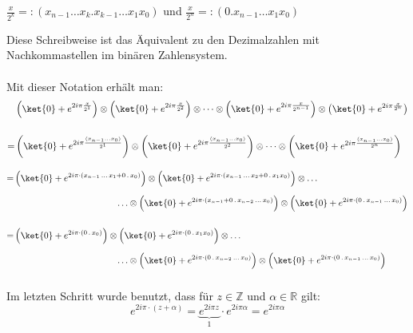 $\frac{x}{2^k} =: (x_{n - 1}\dots x_k.x_{k - 1}\dots x_1x_0)$ \quad und \quad $\frac{x}{2^n} =: (0.x_{n - 1}\dots x_1x_0)$

\noindent Diese Schreibweise ist das Äquivalent zu den Dezimalzahlen mit Nachkommastellen im binären Zahlensystem.
\paragraph{}
\noindent Mit dieser Notation erhält man: 
\[\begin{split}
    &\left( \ket{0}+ e^{2i \pi \frac{x}{2^{1} } }\right)\otimes\left( \ket{0}+ e^{2i \pi \frac{x}{2^{2} } }\right)\otimes \dots \otimes\left( \ket{0}+ e^{2i \pi \frac{x}{2^{n-1} } }\right)\otimes\left( \ket{0}+ e^{2i \pi \frac{x}{2^{n} } }\right) \\[0.5cm]
    =&\left( \ket{0}+ e^{2i \pi \frac{(x_{n-1}\ldots x_0)}{2^{1} } }\right)\otimes\left( \ket{0}+ e^{2i \pi \frac{(x_{n-1}\ldots x_0)}{2^{2} } }\right)\otimes \dots \otimes\left( \ket{0}+ e^{2i \pi \frac{(x_{n-1}\ldots x_0)}{2^{n} } }\right) \\
    \end{split}\]
    
    \[\begin{split}
    =&\left( \ket{0}+ e^{2i \pi \cdot (x_{n-1}\,\ldots\, x_1 + 0\,.\,x_0)}\right)\otimes\left( \ket{0}+ e^{2i \pi \cdot (x_{n-1}\,\ldots\, x_{2}+0\,.\,x_{1} x_0) }\right)\otimes \dots \\[0.2cm]
    &\hspace{4cm}\ldots\otimes\left( \ket{0}+ e^{2i \pi \cdot (x_{n-1}+0\,.\,x_{n-2}\,\ldots\, x_0) }\right)\otimes\left( \ket{0}+ e^{2i \pi \cdot (0\,.\,x_{n-1}\,\ldots\, x_0) } \right) \\[0.5cm]
    =&\left( \ket{0}+ e^{2i \pi \cdot (0\,.\,x_0)}\right)\otimes\left( \ket{0}+ e^{2i \pi \cdot (0\,.\,x_{1} x_0) }\right)\otimes \dots \\[0.2cm]
    &\hspace{4cm}\ldots\otimes\left( \ket{0}+ e^{2i \pi \cdot (0\,.\,x_{n-2}\,\ldots\, x_0) }\right)\otimes\left( \ket{0}+ e^{2i \pi \cdot (0\,.\,x_{n-1}\,\ldots\, x_0) } \right) \\[0.3cm]
    \end{split}\]

\noindent Im letzten Schritt wurde benutzt, dass für $z \in \mathbb{Z}$ und $\alpha \in \mathbb{R}$ gilt:
\[ e^{2i \pi\cdot (z+\alpha)}= \underbrace{e^{2i \pi z}}_{1}\cdot e^{2i \pi \alpha}=e^{2i \pi \alpha}\]

